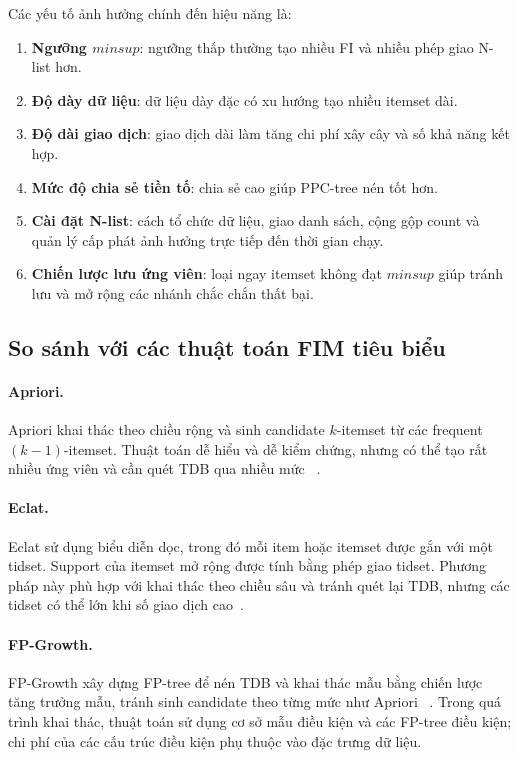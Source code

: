 Các yếu tố ảnh hưởng chính đến hiệu năng là:
\begin{enumerate}
    \item \textbf{Ngưỡng $\mathit{minsup}$}: ngưỡng thấp thường tạo nhiều FI và
          nhiều phép giao N-list hơn.
    \item \textbf{Độ dày dữ liệu}: dữ liệu dày đặc có xu hướng tạo nhiều
          itemset dài.
    \item \textbf{Độ dài giao dịch}: giao dịch dài làm tăng chi phí xây cây và
          số khả năng kết hợp.
    \item \textbf{Mức độ chia sẻ tiền tố}: chia sẻ cao giúp PPC-tree nén tốt hơn.
    \item \textbf{Cài đặt N-list}: cách tổ chức dữ liệu, giao danh sách, cộng gộp
          count và quản lý cấp phát ảnh hưởng trực tiếp đến thời gian chạy.
    \item \textbf{Chiến lược lưu ứng viên}: loại ngay itemset không đạt
          $\mathit{minsup}$ giúp tránh lưu và mở rộng các nhánh chắc chắn thất bại.
\end{enumerate}

\subsection{So sánh với các thuật toán FIM tiêu biểu}

\paragraph{Apriori.}
Apriori khai thác theo chiều rộng và sinh candidate $k$-itemset từ các
frequent $(k-1)$-itemset. Thuật toán dễ hiểu và dễ kiểm chứng, nhưng có thể tạo
rất nhiều ứng viên và cần quét TDB qua nhiều mức
~\cite{agrawal1994fast,han2011datamining}.

\paragraph{Eclat.}
Eclat sử dụng biểu diễn dọc, trong đó mỗi item hoặc itemset được gắn với một
tidset. Support của itemset mở rộng được tính bằng phép giao tidset. Phương pháp
này phù hợp với khai thác theo chiều sâu và tránh quét lại TDB, nhưng các tidset
có thể lớn khi số giao dịch cao~\cite{zaki2000eclat}.

\paragraph{FP-Growth.}
FP-Growth xây dựng FP-tree để nén TDB và khai thác mẫu bằng chiến lược tăng
trưởng mẫu, tránh sinh candidate theo từng mức như Apriori
~\cite{han2000fpgrowth}. Trong quá trình khai thác, thuật toán sử dụng cơ sở mẫu
điều kiện và các FP-tree điều kiện; chi phí của các cấu trúc điều kiện phụ thuộc
vào đặc trưng dữ liệu.

